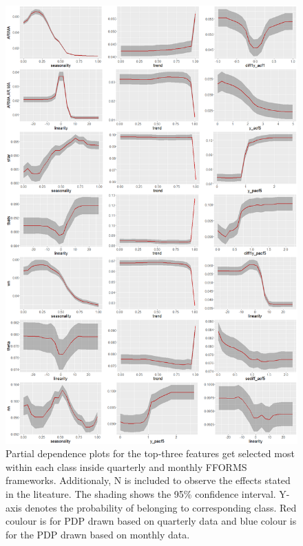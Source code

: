 \documentclass[11pt,a4paper,]{article}
\begin{document}
\begin{figure}
\centering
\includegraphics{figures/pdpquarterly2-1.png}
\caption{\label{fig:pdpquarterly2}Partial dependence plots for the top-three
features get selected most within each class inside quarterly and
monthly FFORMS frameworks. Additionaly, N is included to observe the
effects stated in the liteature. The shading shows the 95\% confidence
interval. Y-axis denotes the probability of belonging to corresponding
class. Red coulour is for PDP drawn based on quarterly data and blue
colour is for the PDP drawn based on monthly data.}
\end{figure}

\newpage
\end{document}
